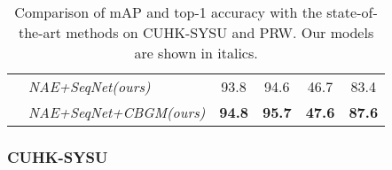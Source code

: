 \documentclass[letterpaper]{article} \usepackage{aaai21}  \usepackage{times}  \usepackage{helvet} \usepackage{courier}  \usepackage[hyphens]{url}  \usepackage{graphicx} \urlstyle{rm} \def\UrlFont{\rm}  \usepackage{natbib}  \usepackage{caption} \usepackage{multirow}
\begin{document}
\begin{table}[t]
{\begin{tabular}{|l|l|cc|cc|}
                                                                   & \textit{NAE+SeqNet(ours)}               & 93.8                              & 94.6          & 46.7           & 83.4          \\
                                                                   & \textit{NAE+SeqNet+CBGM(ours)}          & \textbf{94.8}                     & \textbf{95.7} & \textbf{47.6}  & \textbf{87.6} \\ \hline
        \end{tabular}
    }
    \caption{Comparison of mAP and top-1 accuracy with the state-of-the-art methods on CUHK-SYSU and PRW. Our models are shown in italics.}
    \label{compare_with_sota}
\end{table}

\subsubsection{CUHK-SYSU}
\end{document}

